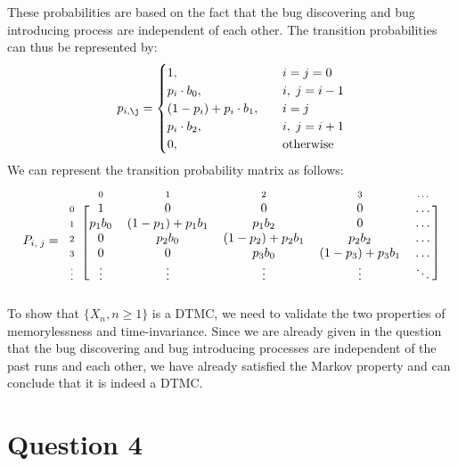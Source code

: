 \documentclass[12pt]{article}
\newcommand{\matindex}[1]{\mbox{\scriptsize#1}}%
\begin{document}
\noindent These probabilities are based on the fact that the bug discovering and bug introducing process are independent of each other. The transition probabilities can thus be represented by: \begin{equation}
    p_{i, \j} = \begin{cases}
        1, \quad & i = j = 0 \\ 
        p_i\cdot b_{0}, \quad & i, \; j = i - 1 \\ 
        (1-p_i) + p_i \cdot b_{1}, \quad & i=j  \\ 
        p_{i} \cdot b_{2}, \quad & i, \; j = i + 1 \\ 
        0, \quad & \text{otherwise}
    \end{cases}
\end{equation} We can represent the transition probability matrix as follows: \begin{equation}
        P_{i, \; j} = \begin{blockarray}{cccccc}
                & \matindex{0} & \matindex{1} & \matindex{2} &\matindex{3} &\matindex{\dots} \\ 
            \begin{block}{c[ccccc]}
                \matindex{0} & 1 & 0 & 0 & 0 & \dots \\ 
                \matindex{1} & p_{1}b_{0} & (1-p_{1}) + p_{1}b_{1} & p_{1} b_{2} & 0 & \dots \\ 
                \matindex{2} & 0 & p_{2}b_{0} & (1-p_{2}) + p_{2}b_{1} & p_{2}b_{2} & \dots \\ 
                \matindex{3} & 0 & 0 & p_{3}b_{0} & (1-p_{3}) + p_{3}b_{1} & \dots \\ 
                \matindex{\vdots} & \vdots & \vdots & \vdots & \vdots & \ddots \\
            \end{block}
        \end{blockarray}
\end{equation} To show that $\{X_n, n \geq 1\}$ is a DTMC, we need to validate the two properties of memorylessness and time-invariance. Since we are already given in the question that the bug discovering and bug introducing processes are independent of the past runs and each other, we have already satisfied the Markov property and can conclude that it is indeed a DTMC. 

\section*{Question 4}
\end{document}
